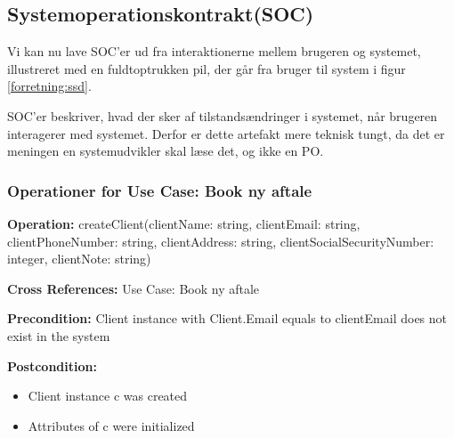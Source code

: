 %
%
%

\subsection{Systemoperationskontrakt(SOC)}
\label{SOC}

Vi kan nu lave SOC'er ud fra interaktionerne mellem brugeren og systemet, illustreret med en fuldtoptrukken pil, der går fra bruger til system i figur \ref{forretning:ssd}.

SOC'er beskriver, hvad der sker af tilstandsændringer i systemet, når brugeren interagerer med systemet.
Derfor er dette artefakt mere teknisk tungt, da det er meningen en systemudvikler skal læse det, og ikke en PO.

\subsubsection{Operationer for Use Case: Book ny aftale}\label{Operation:Book ny aftale}

{\setlength{\parindent}{0cm}
\textbf{Operation:} createClient(clientName: string, clientEmail: string, clientPhoneNumber: string, clientAddress: string, clientSocialSecurityNumber: integer, clientNote: string) 

\textbf{Cross References:} Use Case: Book ny aftale 

\textbf{Precondition:} Client instance with Client.Email equals to clientEmail does not exist in the system

\textbf{Postcondition:}  
		\begin{itemize}
			\item Client instance c was created 
			\item Attributes of c were initialized
		\end{itemize}
		}

